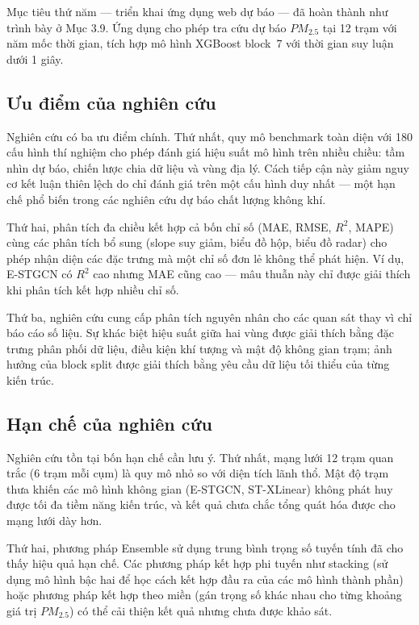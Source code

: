 Mục tiêu thứ năm --- triển khai ứng dụng web dự báo --- đã hoàn thành như trình bày ở Mục 3.9. Ứng dụng cho phép tra cứu dự báo $PM_{2.5}$ tại 12 trạm với năm mốc thời gian, tích hợp mô hình XGBoost block~7 với thời gian suy luận dưới 1 giây.

\subsection{Ưu điểm của nghiên cứu}

Nghiên cứu có ba ưu điểm chính. Thứ nhất, quy mô benchmark toàn diện với 180 cấu hình thí nghiệm cho phép đánh giá hiệu suất mô hình trên nhiều chiều: tầm nhìn dự báo, chiến lược chia dữ liệu và vùng địa lý. Cách tiếp cận này giảm nguy cơ kết luận thiên lệch do chỉ đánh giá trên một cấu hình duy nhất --- một hạn chế phổ biến trong các nghiên cứu dự báo chất lượng không khí.

Thứ hai, phân tích đa chiều kết hợp cả bốn chỉ số (MAE, RMSE, $R^2$, MAPE) cùng các phân tích bổ sung (slope suy giảm, biểu đồ hộp, biểu đồ radar) cho phép nhận diện các đặc trưng mà một chỉ số đơn lẻ không thể phát hiện. Ví dụ, E-STGCN có $R^2$ cao nhưng MAE cũng cao --- mâu thuẫn này chỉ được giải thích khi phân tích kết hợp nhiều chỉ số.

Thứ ba, nghiên cứu cung cấp phân tích nguyên nhân cho các quan sát thay vì chỉ báo cáo số liệu. Sự khác biệt hiệu suất giữa hai vùng được giải thích bằng đặc trưng phân phối dữ liệu, điều kiện khí tượng và mật độ không gian trạm; ảnh hưởng của block split được giải thích bằng yêu cầu dữ liệu tối thiểu của từng kiến trúc.

\subsection{Hạn chế của nghiên cứu}

Nghiên cứu tồn tại bốn hạn chế cần lưu ý. Thứ nhất, mạng lưới 12 trạm quan trắc (6 trạm mỗi cụm) là quy mô nhỏ so với diện tích lãnh thổ. Mật độ trạm thưa khiến các mô hình không gian (E-STGCN, ST-XLinear) không phát huy được tối đa tiềm năng kiến trúc, và kết quả chưa chắc tổng quát hóa được cho mạng lưới dày hơn.

Thứ hai, phương pháp Ensemble sử dụng trung bình trọng số tuyến tính đã cho thấy hiệu quả hạn chế. Các phương pháp kết hợp phi tuyến như stacking (sử dụng mô hình bậc hai để học cách kết hợp đầu ra của các mô hình thành phần) hoặc phương pháp kết hợp theo miền (gán trọng số khác nhau cho từng khoảng giá trị $PM_{2.5}$) có thể cải thiện kết quả nhưng chưa được khảo sát.

